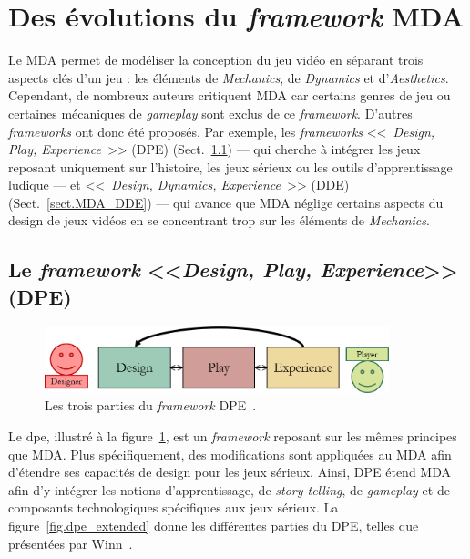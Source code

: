 \section{Des évolutions du \emph{framework} MDA}

Le MDA permet de modéliser la conception du jeu vidéo en séparant trois aspects cl\'es d'un jeu : les éléments de \emph{Mechanics}, de \emph{Dynamics} et d'\emph{Aesthetics}.
Cependant, de nombreux auteurs critiquent MDA car certains genres de jeu ou certaines mécaniques de \emph{gameplay} sont exclus de ce \emph{framework}.
%
D'autres \emph{frameworks} ont donc été proposés.
%
Par exemple, les \emph{frameworks} <<~\emph{Design, Play, Experience}~>> (DPE) (Sect.~\ref{sect.MDA_DPE}) --- qui cherche à intégrer les jeux reposant uniquement sur l'histoire, les jeux sérieux ou les outils d'apprentissage ludique ---
%
et <<~\emph{Design, Dynamics, Experience}~>> (DDE) (Sect.~\ref{sect.MDA_DDE}) --- qui avance que MDA néglige certains aspects du design de jeux vidéos en se concentrant trop sur les éléments de \emph{Mechanics}.



\subsection{Le \emph{framework} <<\emph{Design, Play, Experience}>> (DPE)}
\label{sect.MDA_DPE}

\begin{figure}[H]
    \centering
    \includegraphics[width=10cm]{10_img/chap3/dpe.png} 
    \caption{Les trois parties du \emph{framework} DPE~\cite{Winn2011}.}
    \label{fig.dpe}
\end{figure}

Le \gls{dpe}, illustr\'e \`a la figure~\ref{fig.dpe}, est un \emph{framework} reposant sur les mêmes principes que MDA. 
Plus sp\'ecifiquement, des modifications sont appliquées au MDA afin d'étendre ses capacités de design pour les jeux sérieux. 
Ainsi, DPE étend MDA afin d'y intégrer les notions d'apprentissage, de \emph{story telling}, de \emph{gameplay} et de composants technologiques spécifiques aux jeux sérieux. 
La figure~\ref{fig.dpe_extended} donne les différentes parties du DPE, telles que présentées par Winn~\cite{Winn2011}.


